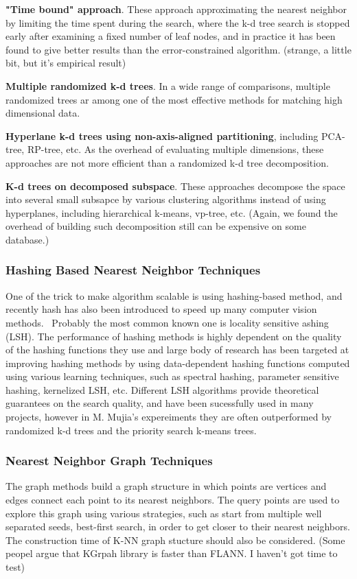 \documentclass[12pt]{article}
\begin{document}
	\textbf{"Time bound" approach}. These approach approximating the nearest neighbor by limiting the time spent during the search, where the k-d tree search is stopped early after examining a fixed number of leaf nodes, and in practice it has been found to give better results than the error-constrained algorithm. (strange, a little bit, but it's empirical result)
	
	\textbf{Multiple randomized k-d trees}.  In a wide range of comparisons, multiple randomized trees ar among one of the most effective methods for matching high dimensional data.
	
	\textbf{Hyperlane k-d trees using non-axis-aligned partitioning}, including PCA-tree, RP-tree, etc. As the overhead of evaluating multiple dimensions, these approaches are not more efficient than a randomized k-d tree decomposition.
	
	\textbf{K-d trees on decomposed subspace}. These approaches decompose  the space into several small subsapce by various clustering algorithms instead of using hyperplanes, including hierarchical k-means, vp-tree, etc. (Again, we found the overhead of building such decomposition still can be expensive on some database.)
	 
\subsubsection{Hashing Based Nearest Neighbor Techniques}
One of the trick to make algorithm scalable is using hashing-based method, and recently hash has also been introduced to speed up many computer vision methods.~\citep{dean2013fast, zhang2014scalable} Probably the most common known one is locality sensitive ashing (LSH). The performance of hashing methods is highly dependent on the quality of the hashing functions they use and large body of research has been targeted at improving hashing methods by using data-dependent hashing functions computed using various learning techniques, such as spectral hashing, parameter sensitive hashing, kernelized LSH, etc. Different LSH algorithms provide theoretical guarantees on the search quality, and have been sucessfully used in many projects, however in M. Mujia's expereiments they are often outperformed by randomized k-d trees and the priority search k-means trees.
\subsubsection{Nearest Neighbor Graph Techniques}
The graph methods build a graph structure in which points are vertices and edges connect each point to its nearest neighbors. The query points are used to explore this graph using various strategies, such as start from multiple well separated seeds, best-first search, in order to get closer to their nearest neighbors. The construction time of K-NN graph stucture should also be considered. (Some peopel argue that KGrpah library is faster than FLANN. I haven't got time to test)
\end{document}
